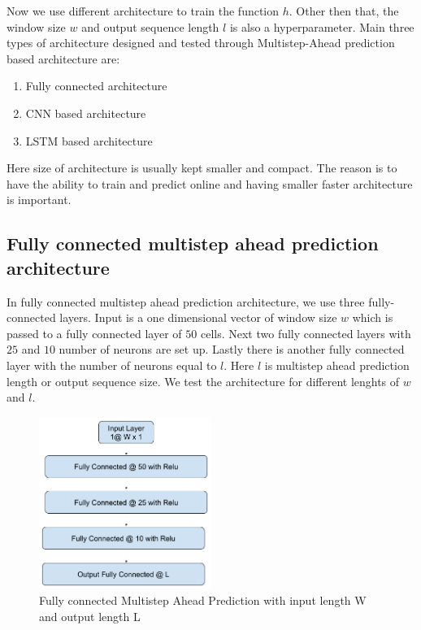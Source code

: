 \documentclass[12pt]{article}
\begin{document}
Now we use different architecture to train the function $h$. Other then that, the window size $w$ and output sequence length $l$ is also a hyperparameter. Main three types of architecture designed and tested through Multistep-Ahead prediction based architecture are:
\begin{enumerate}
	\item Fully connected architecture
	\item CNN based architecture
	\item LSTM based architecture
\end{enumerate}
Here size of architecture is usually kept smaller and compact. The reason is to have the ability to train and predict online and having smaller faster architecture is important.

\subsection{Fully connected multistep ahead prediction architecture}
In fully connected multistep ahead prediction architecture, we use three fully-connected layers. Input is a one dimensional vector of window size $w$ which is passed to a fully connected layer of $50$ cells. Next two fully connected layers with $25$ and $10$ number of neurons are set up. Lastly there is another fully connected layer with the number of neurons equal to $l$. Here $l$ is multistep ahead prediction length or output sequence size. We test the architecture for different lenghts of $w$ and $l$.
\begin{figure}[H]
\centering	
        \includegraphics[width=0.5\textwidth]{images/architecture/NnMultistepAheadPrediction.png}
    \caption{Fully connected Multistep Ahead Prediction with input length W and output length L}
    \label{generalAnomalyDetectionFrameWork}
\end{figure}
\end{document}
